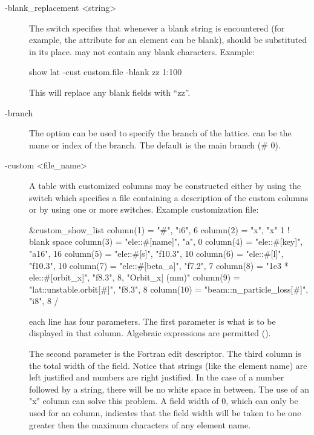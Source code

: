 {{{{{{{{\begin{description}
%
\item[-blank_replacement <string>] \Newline
The  switch specifies that whenever a blank string is encountered (for
example, the  attribute for an element can be blank),  should be substituted
in its place.  may not contain any blank characters. Example:
\begin{example}
  show lat -cust custom.file -blank zz 1:100
\end{example}
This will replace any blank fields with ``zz''.
%
\item[-branch] \Newline
The  option can be used to specify the branch of the lattice.
 can be the name or index of the branch.  The default is the main branch (\# 0).
%
\item[-custom <file_name>] \Newline
A table with customized columns may be constructed either by using the  switch which
specifies a file containing a description of the custom columns or by using one or more
 switches. Example customization file:
\begin{example}
  &custom_show_list
    column(1)  = "#",                      "i6",     6 
    column(2)  = "x",                      "x"       1   ! blank space
    column(3)  = "ele::#[name]",           "a",      0
    column(4)  = "ele::#[key]",            "a16",   16
    column(5)  = "ele::#[s]",              "f10.3", 10
    column(6)  = "ele::#[l]",              "f10.3", 10
    column(7)  = "ele::#[beta_a]",         "f7.2",   7
    column(8)  = "1e3 * ele::#[orbit_x]",  "f8.3",   8, "Orbit_x| (mm)" 
    column(9)  = "lat::unstable.orbit[#]", "f8.3",   8 
    column(10) = "beam::n_particle_loss[#]", "i8",   8 
  /
\end{example}
each  line has four parameters. The first parameter is what is to be displayed in that
column. Algebraic expressions are permitted ().

The second parameter is the Fortran edit descriptor. The third column is the total width of the
field. Notice that strings (like the element name) are left justified and numbers are right
justified. In the case of a number followed by a string, there will be no white space in
between. The use of an "x" column can solve this problem. A field width of 0, which can only be used
for an  column, indicates that the field width will be taken to be one greater
then the maximum characters of any element name.


\end{description}}}}}}}}}
